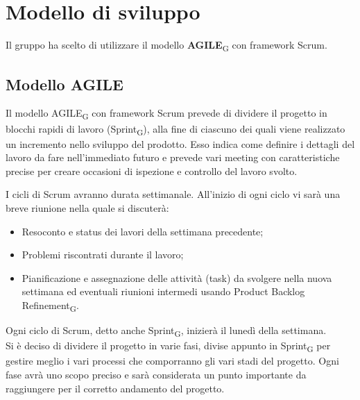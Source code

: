 \section{Modello di sviluppo}
Il gruppo ha scelto di utilizzare il modello \textbf{AGILE}\textsubscript{G} con framework Scrum.

\subsection{Modello AGILE}
Il modello AGILE\textsubscript{G} con framework Scrum prevede di dividere il progetto in blocchi rapidi di lavoro (Sprint\textsubscript{G}),
alla fine di ciascuno dei quali viene realizzato un incremento nello sviluppo del prodotto. 
Esso indica come definire i dettagli del lavoro da fare nell'immediato futuro e prevede 
vari meeting con caratteristiche precise per creare occasioni di ispezione e controllo del lavoro svolto.

I cicli di Scrum avranno durata settimanale. All'inizio di ogni ciclo vi sarà una breve riunione nella quale si discuterà:
\begin{itemize}
	\item Resoconto e status dei lavori della settimana precedente;
	\item Problemi riscontrati durante il lavoro;
	\item Pianificazione e assegnazione delle attività (task) da svolgere nella nuova settimana ed eventuali riunioni intermedi usando Product Backlog Refinement\textsubscript{G}.
\end{itemize}
Ogni ciclo di Scrum, detto anche Sprint\textsubscript{G}, inizierà il lunedì della settimana.\\
Si è deciso di dividere il progetto in varie fasi, divise appunto in Sprint\textsubscript{G} per gestire meglio i vari processi che comporranno gli vari stadi del progetto. Ogni fase avrà uno scopo preciso e sarà considerata un punto importante da raggiungere per il corretto andamento del progetto.
